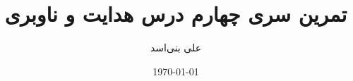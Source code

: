 \documentclass[12pt,onecolumn,a4paper]{article}
\begin{document}
	\title{تمرین سری چهارم درس هدایت و ناوبری} 
	\author{علی بنی‌اسد}
	\date{\today}
	\maketitle
	\newpage
	\tableofcontents
	\listoffigures
	\listoftables
\end{document}
